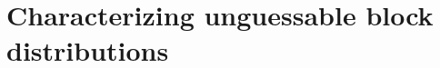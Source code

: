 \documentclass[11pt]{article}
\newcommand{\class}[1]{{\ensuremath{\mathsf{#1}}}}
\newcommand{\gen}{\ensuremath{\class{Gen}}\xspace}
\newcommand{\rep}{\ensuremath{\class{Rep}}\xspace}
\newcommand{\Hoo}{\mathrm{H}_\infty}
\newcommand{\Hav}{\tilde{\mathrm{H}}_\infty}
\newtheorem{lemma}[theorem]{Lemma}
\begin{document}

\section{Characterizing unguessable block distributions}
\label{sec:characterize}
\end{document}
